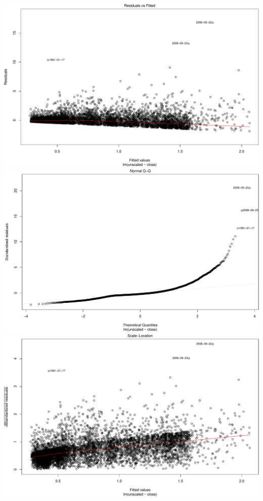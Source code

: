 \documentclass[]{article}
\begin{document}
\includegraphics{Figs/unnamed-chunk-9-1.pdf}
\includegraphics{Figs/unnamed-chunk-9-2.pdf}
\includegraphics{Figs/unnamed-chunk-9-3.pdf}
\end{document}
